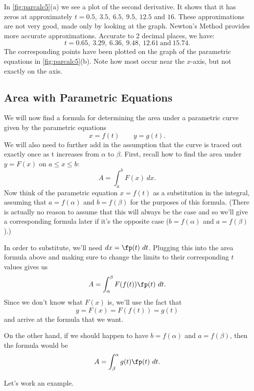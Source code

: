{In \autoref{fig:parcalc5}(a) we see a plot of the second derivative. It shows that it has zeros at approximately $t=0.5,\ 3.5,\ 6.5,\ 9.5,\ 12.5$ and $16$. These approximations are not very good, made only by looking at the graph. Newton's Method provides more accurate approximations. Accurate to 2 decimal places, we have:
\[t=0.65,\ 3.29,\ 6.36,\ 9.48,\ 12.61\ \text{and}\ 15.74.\]
The corresponding points have been plotted on the graph of the parametric equations in \autoref{fig:parcalc5}(b). Note how most occur near the $x$-axis, but not exactly on the axis.}


\subsection{Area with Parametric Equations}

We will now find a formula for determining the area under a parametric curve given by the parametric equations
\[x=f(t)\qquad y=g(t).\]
We will also need to further add in the assumption that the curve is traced out exactly once as t increases from $\alpha$ to $\beta$.
%
First, recall how to find the area under $y=F(x)$ on $a\le x\le b$:
\[A=\int_a^b F(x)\ dx.\]
Now think of the parametric equation $x=f(t)$ as a substitution in the integral, assuming that $a=f(\alpha)$ and $b=f(\beta)$ for the purposes of this formula.  (There is actually no reason to assume that this will always be the case and so we'll give a corresponding formula later if it's the opposite case ($b=f(\alpha)$ and $a=f(\beta)$).)

In order to substitute, we'll need $dx=\fp(t)\ dt$. Plugging this into the area formula above and making sure to change the limits to their corresponding $t$ values gives us
\[A=\int_\alpha^\beta F(f(t))\fp(t)\ dt.\]
Since we don't know what $F(x)$ is, we'll use the fact that
\[y=F(x)=F(f(t))=g(t)\]
and arrive at the formula that we want.


On the other hand, if we should happen to have $b=f(\alpha)$ and $a=f(\beta)$, then the formula would be
\[A=\int_\beta^\alpha g(t)\fp(t)\ dt.\]

Let's work an example.

